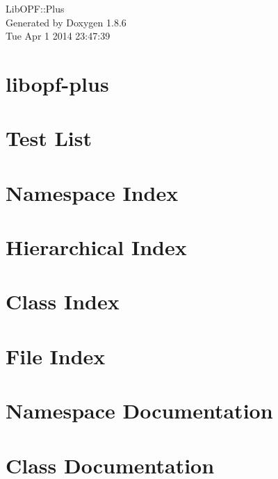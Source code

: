 \documentclass[twoside]{book}
\newcommand{\+}{\discretionary{\mbox{\scriptsize$\hookleftarrow$}}{}{}}
\newcommand{\clearemptydoublepage}{%
  \newpage{\pagestyle{empty}\cleardoublepage}%
}
\begin{document}
\hypersetup{pageanchor=false,
             bookmarks=true,
             bookmarksnumbered=true,
             pdfencoding=unicode
            }
\begin{titlepage}
\vspace*{7cm}
\begin{center}%
{\Large Lib\+O\+P\+F\+:\+:Plus }\\
\vspace*{1cm}
{\large Generated by Doxygen 1.8.6}\\
\vspace*{0.5cm}
{\small Tue Apr 1 2014 23:47:39}\\
\end{center}
\end{titlepage}
\clearemptydoublepage
\tableofcontents
\clearemptydoublepage
{}
\hypersetup{pageanchor=true}

\chapter{libopf-\/plus}
\label{md_README}
\hypertarget{md_README}{}

\chapter{Test List}
\label{test}
\hypertarget{test}{}

\chapter{Namespace Index}

\chapter{Hierarchical Index}

\chapter{Class Index}

\chapter{File Index}

\chapter{Namespace Documentation}

\chapter{Class Documentation}
















\end{document}
